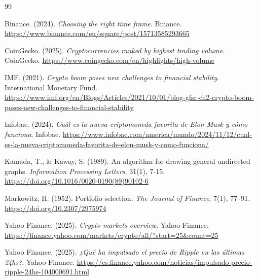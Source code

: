 \documentclass[12pt,letterpaper]{article}   %
\begin{document}
\begin{thebibliography}{99}

    
Binance. (2024). \textit{Choosing the right time frame}. Binance. \url{https://www.binance.com/en/square/post/15713585293665}

CoinGecko. (2025). \textit{Cryptocurrencies ranked by highest trading volume}. CoinGecko. \url{https://www.coingecko.com/en/highlights/high-volume}

IMF. (2021). \textit{Crypto boom poses new challenges to financial stability}. International Monetary Fund. \url{https://www.imf.org/en/Blogs/Articles/2021/10/01/blog-gfsr-ch2-crypto-boom-poses-new-challenges-to-financial-stability}

Infobae. (2024). \textit{Cuál es la nueva criptomoneda favorita de Elon Musk y cómo funciona}. Infobae. \url{https://www.infobae.com/america/mundo/2024/11/12/cual-es-la-nueva-criptomoneda-favorita-de-elon-musk-y-como-funciona/}

Kamada, T., \& Kaway, S. (1989). An algorithm for drawing general undirected graphs. \textit{Information Processing Letters}, 31(1), 7-15. \url{https://doi.org/10.1016/0020-0190(89)90102-6}

Markowitz, H. (1952). Portfolio selection. \textit{The Journal of Finance}, 7(1), 77–91. \url{https://doi.org/10.2307/2975974}

Yahoo Finance. (2025). \textit{Crypto markets overview}. Yahoo Finance. \url{https://finance.yahoo.com/markets/crypto/all/?start=25&count=25}

Yahoo Finance. (2025). \textit{¿Qué ha impulsado el precio de Ripple en las últimas 24hs?}. Yahoo Finance. \url{https://es.finance.yahoo.com/noticias/impulsado-precio-ripple-24hs-104000691.html}


\end{thebibliography}
\end{document}
